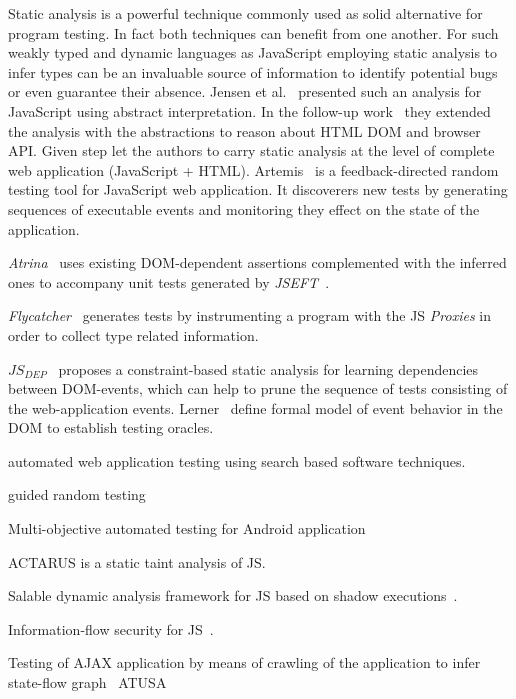 \documentclass[sigconf,review,anonymous]{acmart}
\begin{document}
Static analysis is a powerful technique commonly used as solid alternative for program testing. In fact both techniques can benefit from one another. For such weakly typed and dynamic languages as JavaScript employing static analysis to infer types can be an invaluable source of information to identify potential bugs or even guarantee their absence. Jensen et al.~\cite{tajs2009} presented such an analysis for JavaScript using abstract interpretation. In the follow-up work~\cite{dom2011} they extended the analysis with the abstractions to reason about HTML DOM and browser API. Given step let the authors to carry static analysis at the level of complete web application (JavaScript + HTML). Artemis~\cite{artemis2011} is a feedback-directed random testing tool for JavaScript web application. It discoverers new tests by generating sequences of executable events and monitoring they effect on the state of the application.

\emph{Atrina}~\cite{icst16} uses existing DOM-dependent assertions complemented with the inferred ones to accompany unit tests generated by \emph{JSEFT}~\cite{mirshokraie2015jseft}. 

\emph{Flycatcher}~\cite{de2012automatic} generates tests by instrumenting a program with the JS \emph{Proxies} in order to collect type related information.

\emph{$JS_{DEP}$}~\cite{sung2016static} proposes a constraint-based static analysis for learning dependencies between DOM-events, which can help to prune the sequence of tests consisting of the web-application events. Lerner~\cite{lerner2012modeling} define formal model of event behavior in the DOM to establish testing oracles.

\cite{alshahwan2011automated} automated web application testing using search based software techniques.

\cite{ma2015grt} guided random testing

\cite{mao2016sapienz} Multi-objective automated testing for Android application

\cite{jquery2014}


ACTARUS is a static taint analysis of JS\cite{guarnieri2011saving}.


Salable dynamic analysis framework for JS based on shadow executions~\cite{create.citation}.

Information-flow security for JS~\cite{hedin2012information}.

Testing of AJAX application by means of crawling of the application to infer state-flow graph~\cite{mesbah2012crawling} ATUSA ~\cite{mesbah2012invariant}
\end{document}
